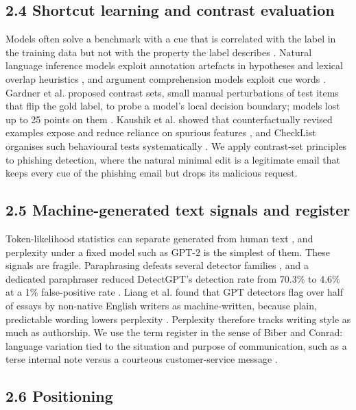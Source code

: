 \documentclass[11pt,letterpaper]{article}
\begin{document}
\subsection{2.4 Shortcut learning and contrast evaluation}

Models often solve a benchmark with a cue that is correlated with the label in the training data but not with the property the label describes \cite{geirhos2020}. Natural language inference models exploit annotation artefacts in hypotheses \cite{gururangan2018} and lexical overlap heuristics \cite{mccoy2019}, and argument comprehension models exploit cue words \cite{niven2019}. Gardner et al. proposed contrast sets, small manual perturbations of test items that flip the gold label, to probe a model's local decision boundary; models lost up to 25 points on them \cite{gardner2020}. Kaushik et al. showed that counterfactually revised examples expose and reduce reliance on spurious features \cite{kaushik2020}, and CheckList organises such behavioural tests systematically \cite{ribeiro2020}. We apply contrast-set principles to phishing detection, where the natural minimal edit is a legitimate email that keeps every cue of the phishing email but drops its malicious request.

\subsection{2.5 Machine-generated text signals and register}

Token-likelihood statistics can separate generated from human text \cite{gehrmann2019,ippolito2020,mitchell2023}, and perplexity under a fixed model such as GPT-2 \cite{radford2019language} is the simplest of them. These signals are fragile. Paraphrasing defeats several detector families \cite{sadasivan2023}, and a dedicated paraphraser reduced DetectGPT's detection rate from 70.3\% to 4.6\% at a 1\% false-positive rate \cite{krishna2023}. Liang et al. found that GPT detectors flag over half of essays by non-native English writers as machine-written, because plain, predictable wording lowers perplexity \cite{liang2023}. Perplexity therefore tracks writing style as much as authorship. We use the term register in the sense of Biber and Conrad: language variation tied to the situation and purpose of communication, such as a terse internal note versus a courteous customer-service message \cite{biber1988variation,biber2009register}.

\subsection{2.6 Positioning}
\end{document}
